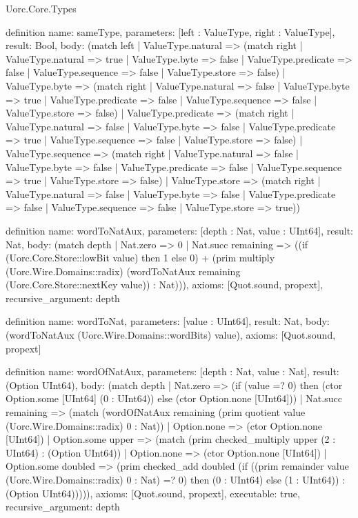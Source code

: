 \begin{lexlean}{Uorc.Core.Types}
\begin{semanticmodule}
definition{
  name: sameType,
  parameters: [left : ValueType, right : ValueType],
  result: Bool,
  body: (match left
    | ValueType.natural => (match right
      | ValueType.natural => true
      | ValueType.byte => false
      | ValueType.predicate => false
      | ValueType.sequence => false
      | ValueType.store => false)
    | ValueType.byte => (match right
      | ValueType.natural => false
      | ValueType.byte => true
      | ValueType.predicate => false
      | ValueType.sequence => false
      | ValueType.store => false)
    | ValueType.predicate => (match right
      | ValueType.natural => false
      | ValueType.byte => false
      | ValueType.predicate => true
      | ValueType.sequence => false
      | ValueType.store => false)
    | ValueType.sequence => (match right
      | ValueType.natural => false
      | ValueType.byte => false
      | ValueType.predicate => false
      | ValueType.sequence => true
      | ValueType.store => false)
    | ValueType.store => (match right
      | ValueType.natural => false
      | ValueType.byte => false
      | ValueType.predicate => false
      | ValueType.sequence => false
      | ValueType.store => true))
}

definition{
  name: wordToNatAux,
  parameters: [depth : Nat, value : UInt64],
  result: Nat,
  body: (match depth
    | Nat.zero => 0
    | Nat.succ remaining => ((if (Uorc.Core.Store::lowBit value) then 1 else 0) + (prim multiply (Uorc.Wire.Domains::radix) (wordToNatAux remaining (Uorc.Core.Store::nextKey value)) : Nat))),
  axioms: [Quot.sound, propext],
  recursive_argument: depth
}

definition{
  name: wordToNat,
  parameters: [value : UInt64],
  result: Nat,
  body: (wordToNatAux (Uorc.Wire.Domains::wordBits) value),
  axioms: [Quot.sound, propext]
}

definition{
  name: wordOfNatAux,
  parameters: [depth : Nat, value : Nat],
  result: (Option UInt64),
  body: (match depth
    | Nat.zero => (if (value =? 0) then (ctor Option.some [UInt64] (0 : UInt64)) else (ctor Option.none [UInt64]))
    | Nat.succ remaining => (match (wordOfNatAux remaining (prim quotient value (Uorc.Wire.Domains::radix) 0 : Nat))
      | Option.none => (ctor Option.none [UInt64])
      | Option.some upper => (match (prim checked_multiply upper (2 : UInt64) : (Option UInt64))
        | Option.none => (ctor Option.none [UInt64])
        | Option.some doubled => (prim checked_add doubled (if ((prim remainder value (Uorc.Wire.Domains::radix) 0 : Nat) =? 0) then (0 : UInt64) else (1 : UInt64)) : (Option UInt64))))),
  axioms: [Quot.sound, propext],
  executable: true,
  recursive_argument: depth
}


\end{semanticmodule}
\end{lexlean}
